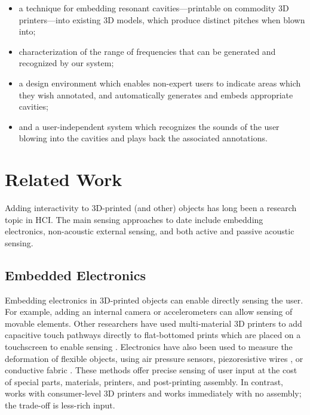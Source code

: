     \begin{itemize}
        \item a technique for embedding resonant cavities---printable on
          commodity 3D printers---into existing 3D models, which produce distinct
          pitches when blown into;
        \item characterization of the range of frequencies that can be generated
          and recognized by our system;
        \item a design environment which enables non-expert users to indicate
          areas which they wish annotated, and automatically generates and embeds
          appropriate cavities;
        \item and a user-independent system which recognizes the sounds of the
          user blowing into the cavities and plays back the associated
          annotations.
    \end{itemize}

  \section{Related Work}
    Adding interactivity to 3D-printed (and other) objects has long been a
    research topic in HCI. The main sensing approaches to date include embedding
    electronics, non-acoustic external sensing, and both active and passive
    acoustic sensing.
    
    \subsection{Embedded Electronics}
        Embedding electronics in 3D-printed objects can enable directly sensing
        the user. For example, adding an internal camera \cite{Savage:2013kua}
        or accelerometers \cite{Hook:2014kp} can allow sensing of movable
        elements. Other researchers have used multi-material 3D printers to add
        capacitive touch pathways directly to flat-bottomed prints which are
        placed on a touchscreen to enable sensing
        \cite{Schmitz:2015vj,Taylor:2016cv,Gotzelmann:2016jc}. Electronics have
        also been used to measure the deformation of flexible objects, using air
        pressure sensors\cite{Slyper:2012gh}, piezoresistive wires
        \cite{Bacher:2016ji}, or conductive fabric \cite{Peng:2015hr}. These
        methods offer precise sensing of user input at the cost of special
        parts, materials, printers, and post-printing assembly. In contrast, \bh
        works with consumer-level 3D printers and works immediately with no
        assembly; the trade-off is less-rich input.
        
